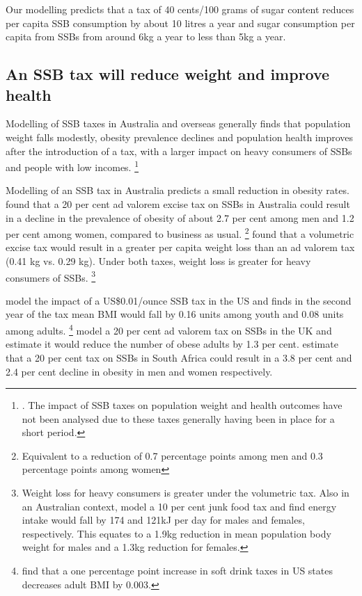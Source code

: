 \documentclass[embargoed]{grattan}
\begin{document}
Our modelling predicts that a tax of 40 cents/100 grams of sugar content reduces per capita SSB consumption by about 10 litres a year and sugar consumption per capita from SSBs from around 6kg a year to less than 5kg a year.

\subsection{An SSB tax will reduce weight and improve health}\label{an-ssb-tax-will-reduce-weight-and-improve-health}

Modelling of SSB taxes in Australia and overseas generally finds that population weight falls modestly, obesity prevalence declines and population health improves after the introduction of a tax, with a larger impact on heavy consumers of SSBs and people with low incomes.%
\footnote{\textcites{Briggs2013Overallincomespecific}{Manyema2014potentialimpact20}{Organization2016FiscalPoliciesDiet}{Veerman2016ImpactTaxSugar}{Sharma2014effectstaxingsugarsweetened}{Andreyeva2011Estimatingpotentialtaxes}.
The impact of SSB taxes on population weight and health outcomes have not been analysed due to these taxes generally having been in place for a short period.}

Modelling of an SSB tax in Australia predicts a small reduction in obesity rates. \textcite{Veerman2016ImpactTaxSugar} found that a 20 per cent ad valorem excise tax on SSBs in Australia could result in a decline in the prevalence of obesity of about 2.7 per cent among men and 1.2 per cent among women, compared to business as usual.%
\footnote{Equivalent to a reduction of 0.7 percentage points among men and 0.3 percentage points among women} \textcite{Sharma2014effectstaxingsugarsweetened} found that a volumetric excise tax would result in a greater per capita weight loss than an ad valorem tax (0.41 kg vs. 0.29 kg).
Under both taxes, weight loss is greater for heavy consumers of SSBs.%
\footnote{Weight loss for heavy consumers is greater under the volumetric tax.
Also in an Australian context, \textcite{Sacks2011Statesshouldstand} model a 10 per cent junk food tax and find energy intake would fall by 174 and 121kJ per day for males and females, respectively.
This equates to a 1.9kg reduction in mean population body weight for males and a 1.3kg reduction for females.}

\textcite{Long2015Costeffectivenesssugar} model the impact of a US\$0.01/ounce SSB tax in the US and finds in the second year of the tax mean BMI would fall by 0.16 units among youth and 0.08 units among adults.%
\footnote{\textcite{Fletcher2010Cansoftdrink} find that a one percentage point increase in soft drink taxes in US states decreases adult BMI by 0.003.} \textcite{Briggs2013Overallincomespecific} model a 20 per cent ad valorem tax on SSBs in the UK and estimate it would reduce the number of obese adults by 1.3 per cent. \textcite{Manyema2014potentialimpact20} estimate that a 20 per cent tax on SSBs in South Africa could result in a 3.8 per cent and 2.4 per cent decline in obesity in men and women respectively.
\end{document}
